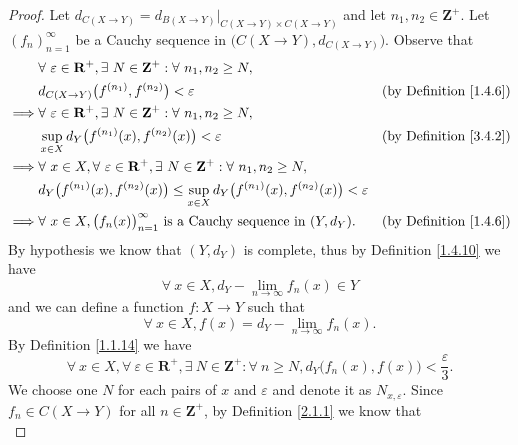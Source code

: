 \begin{proof}
    Let \(d_{C(X \to Y)} = d_{B(X \to Y)}|_{C(X \to Y) \times C(X \to Y)}\) and let \(n_1, n_2 \in \mathbf{Z}^+\).
    Let \((f_n)_{n = 1}^\infty\) be a Cauchy sequence in \(\big(C(X \to Y), d_{C(X \to Y)}\big)\).
    Observe that
    \begin{align*}
                 & \forall\ \varepsilon \in \mathbf{R}^+, \exists\ N \in \mathbf{Z}^+ : \forall\ n_1, n_2 \geq N,                                                         \\
                 & d_{C(X \to Y)}\big(f^{(n_1)}, f^{(n_2)}\big) < \varepsilon                                                        & \text{(by Definition \ref{1.4.6})} \\
        \implies & \forall\ \varepsilon \in \mathbf{R}^+, \exists\ N \in \mathbf{Z}^+ : \forall\ n_1, n_2 \geq N,                                                         \\
                 & \sup_{x \in X} d_Y\big(f^{(n_1)}(x), f^{(n_2)}(x)\big) < \varepsilon                                              & \text{(by Definition \ref{3.4.2})} \\
        \implies & \forall\ x \in X, \forall\ \varepsilon \in \mathbf{R}^+, \exists\ N \in \mathbf{Z}^+ : \forall\ n_1, n_2 \geq N,                                       \\
                 & d_Y\big(f^{(n_1)}(x), f^{(n_2)}(x)\big) \leq \sup_{x \in X} d_Y\big(f^{(n_1)}(x), f^{(n_2)}(x)\big) < \varepsilon                                      \\
        \implies & \forall\ x \in X, \big(f_n(x)\big)_{n = 1}^\infty \text{ is a Cauchy sequence in } (Y, d_Y).                      & \text{(by Definition \ref{1.4.6})}
    \end{align*}
    By hypothesis we know that \((Y, d_Y)\) is complete, thus by Definition \ref{1.4.10} we have
    \[
        \forall\ x \in X, d_Y - \lim_{n \to \infty} f_n(x) \in Y
    \]
    and we can define a function \(f : X \to Y\) such that
    \[
        \forall\ x \in X, f(x) = d_Y - \lim_{n \to \infty} f_n(x).
    \]
    By Definition \ref{1.1.14} we have
    \[
        \forall\ x \in X, \forall\ \varepsilon \in \mathbf{R}^+, \exists\ N \in \mathbf{Z}^+ : \forall\ n \geq N, d_Y\big(f_n(x), f(x)\big) < \frac{\varepsilon}{3}.
    \]
    We choose one \(N\) for each pairs of \(x\) and \(\varepsilon\) and denote it as \(N_{x, \varepsilon}\).
    Since \(f_n \in C(X \to Y)\) for all \(n \in \mathbf{Z}^+\), by Definition \ref{2.1.1} we know that
    \[
\]
\end{proof}
